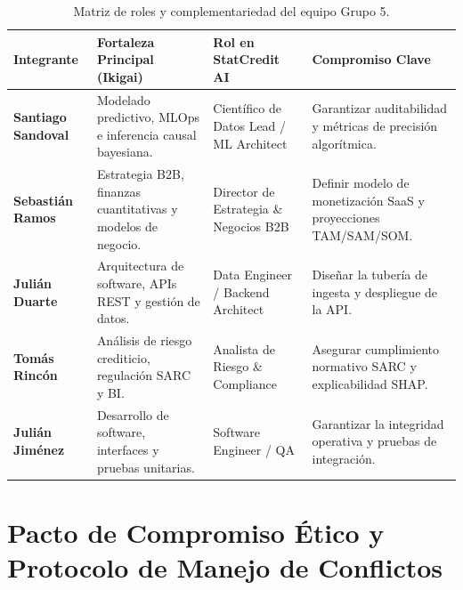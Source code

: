 \documentclass[11pt,a4paper]{article}
\begin{document}
\begin{table}[h!]
\centering
\small
\begin{tabular}{p{3.5cm} p{4cm} p{4cm} p{3.5cm}}
\toprule
\textbf{Integrante} & \textbf{Fortaleza Principal (Ikigai)} & \textbf{Rol en StatCredit AI} & \textbf{Compromiso Clave} \\
\midrule
\textbf{Santiago Sandoval} & Modelado predictivo, MLOps e inferencia causal bayesiana. & Científico de Datos Lead / ML Architect & Garantizar auditabilidad y métricas de precisión algorítmica. \\
\midrule
\textbf{Sebastián Ramos} & Estrategia B2B, finanzas cuantitativas y modelos de negocio. & Director de Estrategia \& Negocios B2B & Definir modelo de monetización SaaS y proyecciones TAM/SAM/SOM. \\
\midrule
\textbf{Julián Duarte} & Arquitectura de software, APIs REST y gestión de datos. & Data Engineer / Backend Architect & Diseñar la tubería de ingesta y despliegue de la API. \\
\midrule
\textbf{Tomás Rincón} & Análisis de riesgo crediticio, regulación SARC y BI. & Analista de Riesgo \& Compliance & Asegurar cumplimiento normativo SARC y explicabilidad SHAP. \\
\midrule
\textbf{Julián Jiménez} & Desarrollo de software, interfaces y pruebas unitarias. & Software Engineer / QA & Garantizar la integridad operativa y pruebas de integración. \\
\bottomrule
\end{tabular}
\caption{Matriz de roles y complementariedad del equipo Grupo 5.}
\end{table}

\section{Pacto de Compromiso Ético y Protocolo de Manejo de Conflictos}
\end{document}
